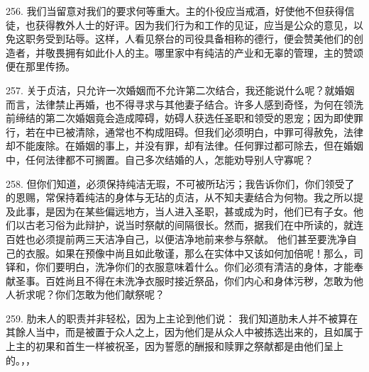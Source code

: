 256. 我们当留意对我们的要求何等重大。主的仆役应当戒酒，好使他不但获得信徒，也获得教外人士的好评。因为我们行为和工作的见证，应当是公众的意见，以免这职务受到玷辱。这样，人看见祭台的司役具备相称的德行，便会赞美他们的创造者，并敬畏拥有如此仆人的主。哪里家中有纯洁的产业和无辜的管理，主的赞颂便在那里传扬。\par

257. 关于贞洁，只允许一次婚姻而不允许第二次结合，我还能说什么呢？就婚姻而言，法律禁止再婚，也不得寻求与其他妻子结合。许多人感到奇怪，为何在领洗前缔结的第二次婚姻竟会造成障碍，妨碍人获选任圣职和领受的恩宠；因为即使罪行，若在中已被清除，通常也不构成阻碍。但我们必须明白，中罪可得赦免，法律却不能废除。在婚姻的事上，并没有罪，却有法律。任何罪过都可除去，但在婚姻中，任何法律都不可搁置。自己多次结婚的人，怎能劝导别人守寡呢？\par

258. 但你们知道，必须保持纯洁无瑕，不可被所玷污；我告诉你们，你们领受了的恩赐，常保持着纯洁的身体与无玷的贞洁，从不知夫妻结合为何物。我之所以提及此事，是因为在某些偏远地方，当人进入圣职，甚或成为时，他们已有子女。他们以古老习俗为此辩护，说当时祭献的间隔很长。然而，据我们在中所读的，就连百姓也必须提前两三天洁净自己，以便洁净地前来参与祭献。 他们甚至要洗净自己的衣服。如果在预像中尚且如此敬谨，那么在实体中又该如何加倍呢！那么，司铎和，你们要明白，洗净你们的衣服意味着什么。你们必须有清洁的身体，才能奉献圣事。百姓尚且不得在未洗净衣服时接近祭品，你们内心和身体污秽，怎敢为他人祈求呢？你们怎敢为他们献祭呢？\par

259. 肋未人的职责并非轻松，因为上主论到他们说：  我们知道肋未人并不被算在其餘人当中，而是被置于众人之上，因为他们是从众人中被拣选出来的，且如属于上主的初果和首生一样被祝圣，因为誓愿的酬报和赎罪之祭献都是由他们呈上的。，， \par

